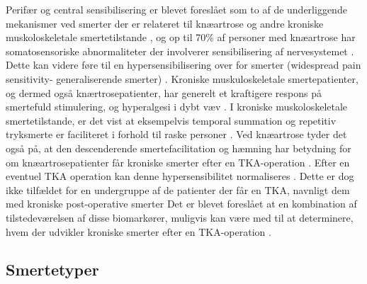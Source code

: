 Perifær og central sensibilisering er blevet foreslået som to af de underliggende mekanismer ved smerter der er relateret til knæartrose og andre kroniske muskoloskeletale smertetilstande \citep{Arendt-Nielsen2010}, og op til 70\% af personer med knæartrose har somatosensoriske abnormaliteter der involverer sensibilisering af nervesystemet \citep{lars}. Dette kan videre føre til en  hypersensibilisering over for smerter (widespread pain sensitivity- generaliserende smerter)  \citep{Petersen2016}.  Kroniske muskuloskeletale smertepatienter, og dermed også knærtrosepatienter, har generelt et kraftigere respons på smertefuld stimulering, og hyperalgesi i dybt væv \citep{Arendt-Nielsen2010}. I kroniske muskoloskeletale smertetilstande, er det vist at eksempelvis temporal summation og repetitiv tryksmerte er faciliteret i forhold til raske personer \citep{widespread}. Ved knæartrose tyder det også på, at den descenderende smertefacilitation og hæmning har betydning for om knæartrosepatienter får kroniske smerter efter en TKA-operation \citep{Petersen2016}. Efter en eventuel TKA operation kan denne hypersensibilitet normaliseres \citep{Petersen2016} \citep{graven2012}. Dette er dog ikke tilfældet for en undergruppe af de patienter der får en TKA, navnligt dem med kroniske post-operative smerter \citep{Petersen2016}
Det er blevet foreslået at en kombination af tilstedeværelsen af disse biomarkører, muligvis kan være med til at determinere, hvem der udvikler kroniske smerter efter en TKA-operation \citep{Petersen2016}.


\subsection{Smertetyper}


